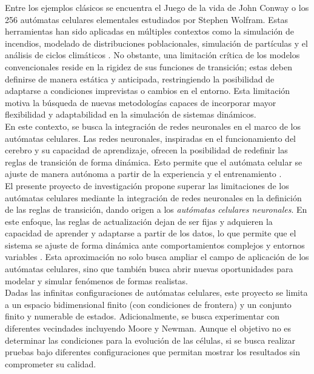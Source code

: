 \documentclass[letterpaper,10pt,oneside]{article}
\begin{document}
	Entre los ejemplos clásicos se encuentra el Juego de la vida de John Conway o los 256 autómatas celulares elementales estudiados por Stephen Wolfram. Estas herramientas han sido aplicadas en múltiples contextos como la simulación de incendios, modelado de distribuciones poblacionales, simulación de partículas y el análisis de ciclos climáticos \cite{darg}. No obstante, una limitación crítica de los modelos convencionales reside en la rigidez de sus funciones de transición; estas deben definirse de manera estática y anticipada, restringiendo la posibilidad de adaptarse a condiciones imprevistas o cambios en el entorno. Esta limitación motiva la búsqueda de nuevas metodologías capaces de incorporar mayor flexibilidad y adaptabilidad en la simulación de sistemas dinámicos. \\
	
	En este contexto, se busca la integración de redes neuronales en el marco de los autómatas celulares. Las redes neuronales, inspiradas en el funcionamiento del cerebro y su capacidad de aprendizaje, ofrecen la posibilidad de redefinir las reglas de transición de forma dinámica. Esto permite que el autómata celular se ajuste de manera autónoma a partir de la experiencia y el entrenamiento \cite{RN}. \\
	
	El presente proyecto de investigación propone superar las limitaciones de los autómatas celulares mediante la integración de redes neuronales en la definición de las reglas de transición, dando origen a los \textit{autómatas celulares neuronales}. En este enfoque, las reglas de actualización dejan de ser fijas y adquieren la capacidad de aprender y adaptarse a partir de los datos, lo que permite que el sistema se ajuste de forma dinámica ante comportamientos complejos y entornos variables \cite{redesNeuronales, distill}. Esta aproximación no solo busca ampliar el campo de aplicación de los autómatas celulares, sino que también busca abrir nuevas oportunidades para modelar y simular fenómenos de formas realistas.  \\
	
	Dadas las infinitas configuraciones de autómatas celulares, este proyecto se limita a un espacio bidimensional finito (con condiciones de frontera) y un conjunto finito y numerable de estados. Adicionalmente, se busca experimentar con diferentes vecindades incluyendo Moore y Newman. Aunque el objetivo no es determinar las condiciones para la evolución de las células, si se busca realizar pruebas bajo diferentes configuraciones que permitan mostrar los resultados sin comprometer su calidad.
	
\end{document}
